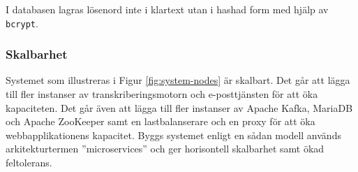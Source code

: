 I databasen lagras lösenord inte i klartext utan i hashad form med hjälp av \verb|bcrypt|. 

\subsubsection{Skalbarhet}
Systemet som illustreras i Figur \ref{fig:system-nodes} är skalbart. Det går
att lägga till fler instanser av transkriberingsmotorn och e-posttjänsten för
att öka kapaciteten. Det går även att lägga till fler instanser av Apache
Kafka, MariaDB och Apache ZooKeeper samt en lastbalanserare och en proxy för
att öka webbapplikationens kapacitet. Byggs systemet enligt en sådan modell
används arkitekturtermen ''microservices'' och ger horisontell skalbarhet samt
ökad feltolerans. 
